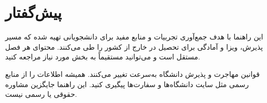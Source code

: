 \documentclass[
  a4paper,
  12pt,
  oneside,
  openany,
]{book}
\begin{document}
\linespread{1.6}\selectfont


\thispagestyle{empty}
\newpage

\chapter*{پیش‌گفتار}

این راهنما با هدف جمع‌آوری تجربیات و منابع مفید برای دانشجویانی تهیه شده
که مسیر پذیرش، ویزا و آمادگی برای تحصیل در خارج از کشور را طی می‌کنند.
محتوای هر فصل مستقل است و می‌توانید مستقیماً به بخش مورد نیاز مراجعه کنید.

\begin{warningbox}[title={سلب مسئولیت}]
  قوانین مهاجرت و پذیرش دانشگاه به‌سرعت تغییر می‌کنند.
  همیشه اطلاعات را از منابع رسمی مثل سایت دانشگاه‌ها و سفارت‌ها
   پیگیری کنید. این راهنما جایگزین مشاوره حقوقی یا
  رسمی نیست.
\end{warningbox}

\tableofcontents
\newpage











\end{document}
